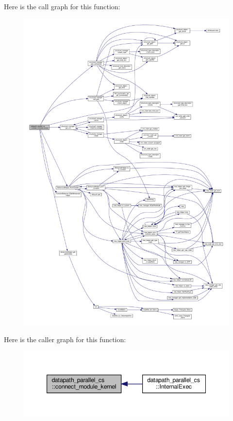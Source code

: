 Here is the call graph for this function\+:
\nopagebreak
\begin{figure}[H]
\begin{center}
\leavevmode
\includegraphics[width=350pt]{d7/d60/classdatapath__parallel__cs_a641a653a7ee22f066b3c6f592af2669f_cgraph}
\end{center}
\end{figure}
Here is the caller graph for this function\+:
\nopagebreak
\begin{figure}[H]
\begin{center}
\leavevmode
\includegraphics[width=347pt]{d7/d60/classdatapath__parallel__cs_a641a653a7ee22f066b3c6f592af2669f_icgraph}
\end{center}
\end{figure}
\mbox{\label{classdatapath__parallel__cs_af732dc543f89fa502e853c2abeac2ef8}} 
